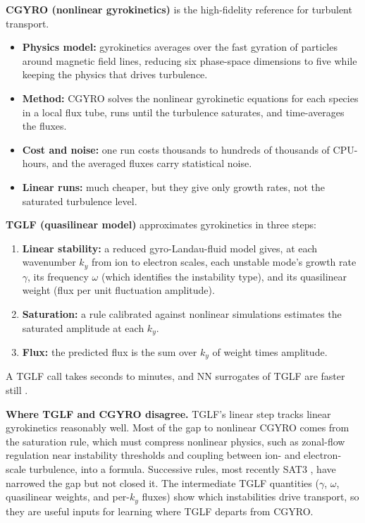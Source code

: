 \documentclass[10pt,letterpaper]{article}
\begin{document}
\textbf{CGYRO (nonlinear gyrokinetics)} \cite{candy2016} is the high-fidelity reference for turbulent transport.
\begin{itemize}
      \item \textbf{Physics model:} gyrokinetics averages over the fast gyration of particles around magnetic field lines, reducing six phase-space dimensions to five while keeping the physics that drives turbulence.
      \item \textbf{Method:} CGYRO solves the nonlinear gyrokinetic equations for each species in a local flux tube, runs until the turbulence saturates, and time-averages the fluxes.
      \item \textbf{Cost and noise:} one run costs thousands to hundreds of thousands of CPU-hours, and the averaged fluxes carry statistical noise.
      \item \textbf{Linear runs:} much cheaper, but they give only growth rates, not the saturated turbulence level.
\end{itemize}

\textbf{TGLF (quasilinear model)} \cite{staebler2007} approximates gyrokinetics in three steps:
\begin{enumerate}
      \item \textbf{Linear stability:} a reduced gyro-Landau-fluid model gives, at each wavenumber $k_y$ from ion to electron scales, each unstable mode's growth rate $\gamma$, its frequency $\omega$ (which identifies the instability type), and its quasilinear weight (flux per unit fluctuation amplitude).
      \item \textbf{Saturation:} a rule calibrated against nonlinear simulations estimates the saturated amplitude at each $k_y$.
      \item \textbf{Flux:} the predicted flux is the sum over $k_y$ of weight times amplitude.
\end{enumerate}

A TGLF call takes seconds to minutes, and NN surrogates of TGLF are faster still \cite{meneghini2017}.

\textbf{Where TGLF and CGYRO disagree.} TGLF's linear step tracks linear gyrokinetics reasonably well. Most of the gap to nonlinear CGYRO comes from the saturation rule, which must compress nonlinear physics, such as zonal-flow regulation near instability thresholds and coupling between ion- and electron-scale turbulence, into a formula. Successive rules, most recently SAT3 \cite{dudding2022}, have narrowed the gap but not closed it. The intermediate TGLF quantities ($\gamma$, $\omega$, quasilinear weights, and per-$k_y$ fluxes) show which instabilities drive transport, so they are useful inputs for learning where TGLF departs from CGYRO.
\end{document}
